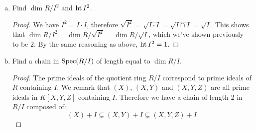 \begin{problem*}{3}
\begin{enumerate}[(a)]
    \item Find \(\dim R/I^2\) and \(\operatorname{ht} I^2\).
    \begin{proof}
    We have \(I^2 = I \cdot I\), therefore \(\sqrt{I^2} = \sqrt{I \cdot I} = \sqrt{I \cap I} = \sqrt{I}\). This shows that \(\dim R/I^2 = \dim R/\sqrt{I^2} = \dim R/\sqrt{I}\), which we've shown previously to be \(2\). By the same reasoning as above, \(\operatorname{ht}{I^2} = 1\).
    \end{proof}
    
    \item Find a chain in \(\operatorname{Spec}(R/I)\) of length equal to \(\dim R/I\).
    \begin{proof}
    The prime ideals of the quotient ring \(R/I\) correspond to prime ideals of \(R\) containing \(I\). We remark that \((X)\), \((X, Y)\) and \((X, Y, Z)\) are all prime ideals in \(K[X, Y, Z]\) containing \(I\). Therefore we have a chain of length 2 in \(R/I\) composed of:
    \[
        (X) + I \subsetneq (X, Y) + I \subsetneq (X, Y, Z) + I
    \]
    \end{proof}
\end{enumerate}
\end{problem*}

